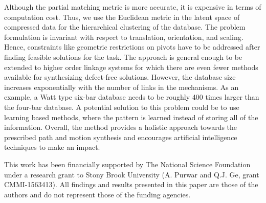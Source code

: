 \documentclass[twocolumn,10pt]{asme2ej}
\begin{document}
Although the partial matching metric is more accurate, it is expensive in terms of computation cost.
Thus, we use the Euclidean metric in the latent space of compressed data for the hierarchical clustering of the database.
The problem formulation is invariant with respect to translation, orientation, and scaling.
Hence, constraints like geometric restrictions on pivots have to be addressed after finding feasible solutions for the task.
The approach is general enough to be extended to higher order linkage systems for which there are even fewer methods available for synthesizing defect-free solutions.
However, the database size increases exponentially with the number of links in the mechanisms.
As an example, a Watt type six-bar database needs to be roughly 400 times larger than the four-bar database.
A potential solution to this problem could be to use learning based methods, where the pattern is learned instead of storing all of the information.
Overall, the method provides a holistic approach towards the prescribed path and motion synthesis and encourages artificial intelligence techniques to make an impact.


\begin{acknowledgment}
This work has been financially supported by The National Science Foundation under a research grant to Stony Brook University (A. Purwar and Q.J. Ge, grant CMMI-1563413). All findings and results presented in this paper are those of the authors and do not represent those of the funding agencies.
\end{acknowledgment}



\newpage
\clearpage
\end{document}
